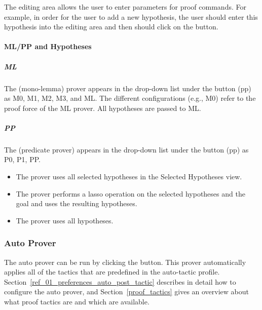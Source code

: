 The editing area allows the user to enter parameters for proof commands. For example, in order for the user to add a new hypothesis, the user should enter this hypothesis into the editing area and then should click on the  button.

\paragraph{ML/PP and Hypotheses}

\subparagraph{ML}

The  (mono-lemma) prover appears in the drop-down list under the button (pp) as M0, M1, M2, M3, and ML. The different configurations (e.g., M0) refer to the proof force of the ML prover. All hypotheses are passed to ML.

\subparagraph{PP}

The  (predicate prover) appears in the drop-down list under the button (pp) as P0, P1, PP.

\begin{itemize}
	\item The  prover uses all selected hypotheses in the \textsf{Selected Hypotheses} view.
	\item The  prover performs a lasso operation on the selected hypotheses and the goal and uses the resulting hypotheses.
	\item The  prover uses all hypotheses. 
\end{itemize}

\subsubsection{Auto Prover}
\label{auto_prover}

The auto prover can be run by clicking the  button. This prover automatically applies all of the tactics that are predefined in the auto-tactic profile. Section~\ref{ref_01_preferences_auto_post_tactic} describes in detail how to configure the auto prover, and Section~\ref{proof_tactics} gives an overview about what proof tactics are and which are available.


